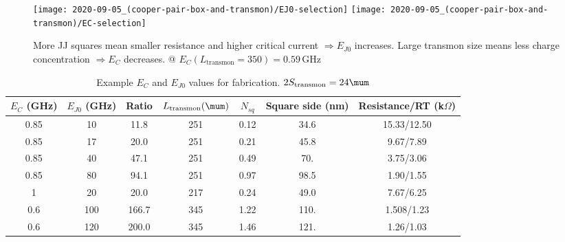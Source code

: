 \begin{figure}[h]
  \centering%
  \texttt{[image: 2020-09-05\_(cooper-pair-box-and-transmon)/EJ0-selection]}%
  \texttt{[image: 2020-09-05\_(cooper-pair-box-and-transmon)/EC-selection]}
  \caption{\small More JJ squares  mean smaller resistance and higher
    critical current $\Rightarrow  E_{J0}$ increases.  Large transmon
    size   means  less   charge  concentration   $\Rightarrow  E_{C}$
    decreases.                                                      @
    $E_C(L_{\text{transmon}}=350)                                   =
    0.59\,$GHz\label{fig:EJ0-EC-selection}}
\end{figure}

 \begin{table}[h]
   \centering
   \caption{Example     $E_C$     and     $E_{J0}$     values     for
     fabrication. $2S_{\text{transmon}}=24\mum$ \label{tab:transmon-fabrication-parameters}}
   \begin{tabular}{|c|c|c|c|c|c|c|}
     \hline
     $E_{C}$ (GHz) & $E_{J0}$ (GHz) & Ratio &  $L_{\text{transmon}} (\mum)$ & $N_{sq}$ & Square side (nm) & Resistance/RT (k$\Omega$)\\\hline
     0.85 &               10 &    11.8 &              251 &                  0.12 &              34.6 &                    15.33/12.50  \\
     0.85 &               17 &    20.0 &              251 &                  0.21 &              45.8 &                    9.67/7.89  \\
     0.85 &               40 &    47.1 &              251 &                  0.49 &               70. &                    3.75/3.06     \\
     0.85 &               80 &    94.1 &              251 &                  0.97 &              98.5 &                    1.90/1.55  \\
     1 &               20 &    20.0 &              217 &                  0.24 &              49.0 &                    7.67/6.25  \\
     0.6 &              100 &   166.7 &              345 &                  1.22 &              110. &                    1.508/1.23 \\
     0.6 &              120 &   200.0 &              345 &                  1.46 &              121. &                    1.26/1.03 \\\hline
   \end{tabular}
 \end{table}

